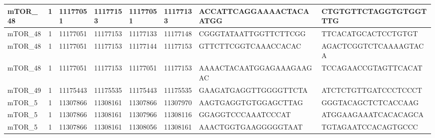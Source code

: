 \begin{landscape}
\begin{longtable}{| p{} | p{} | p{} | p{} | p{} | p{} | p{} | p{} |}
\multicolumn{1}{|l|}{mTOR\_48}   & \multicolumn{1}{c|}{1}  & \multicolumn{1}{l|}{11177051}  & \multicolumn{1}{l|}{11177153}  & \multicolumn{1}{l|}{11177051}  & \multicolumn{1}{l|}{11177133}  & \multicolumn{1}{l|}{ACCATTCAGGAAAACTACAATGG}         & \multicolumn{1}{l|}{CTGTGTTCTAGGTGTGGTTTG}         \\ \hline
\multicolumn{1}{|l|}{mTOR\_48}   & \multicolumn{1}{c|}{1}  & \multicolumn{1}{l|}{11177051}  & \multicolumn{1}{l|}{11177153}  & \multicolumn{1}{l|}{11177133}  & \multicolumn{1}{l|}{11177148}  & \multicolumn{1}{l|}{CGGGTATAATTGGTTCTTCGG}           & \multicolumn{1}{l|}{TTCACATGCACTCCTGTGT}           \\ \hline
\multicolumn{1}{|l|}{mTOR\_48}   & \multicolumn{1}{c|}{1}  & \multicolumn{1}{l|}{11177051}  & \multicolumn{1}{l|}{11177153}  & \multicolumn{1}{l|}{11177144}  & \multicolumn{1}{l|}{11177153}  & \multicolumn{1}{l|}{GTTCTTCGGTCAAACCACAC}            & \multicolumn{1}{l|}{AGACTCGGTCTCAAAAGTACA}         \\ \hline
\multicolumn{1}{|l|}{mTOR\_48}   & \multicolumn{1}{c|}{1}  & \multicolumn{1}{l|}{11177051}  & \multicolumn{1}{l|}{11177153}  & \multicolumn{1}{l|}{11177051}  & \multicolumn{1}{l|}{11177153}  & \multicolumn{1}{l|}{AAAACTACAATGGAGAAAGAAGAC}        & \multicolumn{1}{l|}{TCCAGAACCGTAGTTCACAT}          \\ \hline
\multicolumn{1}{|l|}{mTOR\_49}   & \multicolumn{1}{c|}{1}  & \multicolumn{1}{l|}{11175443}  & \multicolumn{1}{l|}{11175535}  & \multicolumn{1}{l|}{11175443}  & \multicolumn{1}{l|}{11175535}  & \multicolumn{1}{l|}{GAAGATGAGGTTGGGGTTCTA}           & \multicolumn{1}{l|}{ATCTCTGTTGATCCCTCCCT}          \\ \hline
\multicolumn{1}{|l|}{mTOR\_5}    & \multicolumn{1}{c|}{1}  & \multicolumn{1}{l|}{11307866}  & \multicolumn{1}{l|}{11308161}  & \multicolumn{1}{l|}{11307866}  & \multicolumn{1}{l|}{11307970}  & \multicolumn{1}{l|}{AAGTGAGGTGTGGAGCTTAG}            & \multicolumn{1}{l|}{GGGTACAGCTCTCACCAAG}           \\ \hline
\multicolumn{1}{|l|}{mTOR\_5}    & \multicolumn{1}{c|}{1}  & \multicolumn{1}{l|}{11307866}  & \multicolumn{1}{l|}{11308161}  & \multicolumn{1}{l|}{11307966}  & \multicolumn{1}{l|}{11308116}  & \multicolumn{1}{l|}{GGAGGTCCCAAATCCCAT}              & \multicolumn{1}{l|}{ATGGAAGAAATCACACAGCA}          \\ \hline
\multicolumn{1}{|l|}{mTOR\_5}    & \multicolumn{1}{c|}{1}  & \multicolumn{1}{l|}{11307866}  & \multicolumn{1}{l|}{11308161}  & \multicolumn{1}{l|}{11308056}  & \multicolumn{1}{l|}{11308161}  & \multicolumn{1}{l|}{AAACTGGTGAAGGGGGTAAT}            & \multicolumn{1}{l|}{TGTAGAATCCACAGTGCCC}           \\ \hline

\end{longtable}
\end{landscape}
